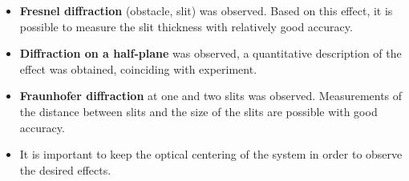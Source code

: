 \begin{itemize}
    \item \textbf{Fresnel diffraction} (obstacle, slit) was observed. Based on this effect, it is possible to measure the slit thickness with relatively good accuracy.
    \item \textbf{Diffraction on a half-plane} was observed, a quantitative description of the effect was obtained, coinciding with experiment.
    \item \textbf{Fraunhofer diffraction} at one and two slits was observed. Measurements of the distance between slits and the size of the slits are possible with good accuracy.
    \item It is important to keep the optical centering of the system in order to observe the desired effects.
\end{itemize}
